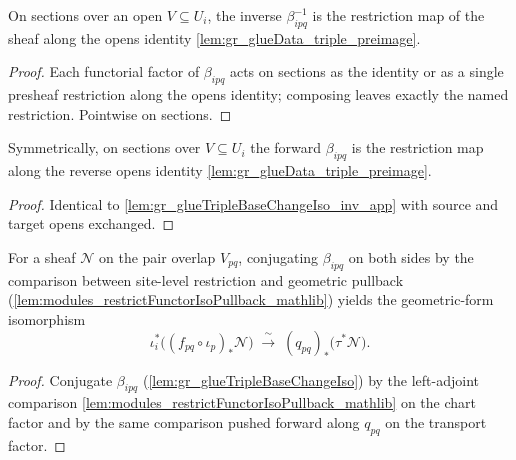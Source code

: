 \begin{lemma}

  \label{lem:gr_glueTripleBaseChangeIso_inv_app}
  On sections over an open \(V\subseteq U_i\), the inverse \(\beta_{ipq}^{-1}\) is the
  restriction map of the sheaf along the opens identity
  \cref{lem:gr_glueData_triple_preimage}.
\end{lemma}
\begin{proof}
  \leanok
  Each functorial factor of \(\beta_{ipq}\) acts on sections as the identity or as a
  single presheaf restriction along the opens identity; composing leaves exactly the
  named restriction. Pointwise on sections.
\end{proof}

\begin{lemma}

  \label{lem:gr_glueTripleBaseChangeIso_hom_app}
  Symmetrically, on sections over \(V\subseteq U_i\) the forward \(\beta_{ipq}\) is the
  restriction map along the reverse opens identity
  \cref{lem:gr_glueData_triple_preimage}.
\end{lemma}
\begin{proof}
  \leanok
  Identical to \cref{lem:gr_glueTripleBaseChangeIso_inv_app} with source and target
  opens exchanged.
\end{proof}

\begin{lemma}

  \label{lem:gr_glueTripleFactorIso}
  For a sheaf \(\mathcal{N}\) on the pair overlap \(V_{pq}\), conjugating \(\beta_{ipq}\)
  on both sides by the comparison between site-level restriction and geometric pullback
  (\cref{lem:modules_restrictFunctorIsoPullback_mathlib}) yields the geometric-form
  isomorphism
  \[
    \iota_i^{*}\bigl((f_{pq}\circ\iota_p)_{*}\mathcal{N}\bigr)
      \;\xrightarrow{\ \sim\ }\;
    (q_{pq})_{*}\bigl(\tau^{*}\mathcal{N}\bigr).
  \]
\end{lemma}
\begin{proof}
  \leanok
  Conjugate \(\beta_{ipq}\) (\cref{lem:gr_glueTripleBaseChangeIso}) by the left-adjoint
  comparison \cref{lem:modules_restrictFunctorIsoPullback_mathlib} on the chart factor
  and by the same comparison pushed forward along \(q_{pq}\) on the transport factor.
\end{proof}

